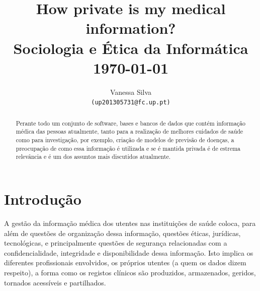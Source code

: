 \documentclass[conference]{IEEEtran}
\begin{document}
%
%

\title{How private is my medical information?\\
	\vspace*{10pt} \large Sociologia e Ética da Informática\\
		\normalsize \today{} }
%
\author{Vanessa Silva\\
	{\texttt{(up201305731@fc.up.pt)}}\\
}

\maketitle



\begin{abstract}

Perante todo um conjunto de software, bases e bancos de dados que contém informação médica das pessoas atualmente, tanto para a realização de melhores cuidados de saúde como para investigação, por exemplo, criação de modelos de previsão de doenças, a preocupação de como essa informação é utilizada e se é mantida privada é de estrema relevância e é um dos assuntos mais discutidos atualmente.

\end{abstract}



\IEEEpeerreviewmaketitle


\section{Introdução}

A gestão da informação médica dos utentes nas instituições de saúde coloca, para além de questões de organização dessa informação, questões éticas, jurídicas, tecnológicas, e principalmente questões de segurança relacionadas com a confidencialidade, integridade e disponibilidade dessa informação.
Isto implica os diferentes profissionais envolvidos, os próprios utentes (a quem os dados dizem respeito), a forma como os registos clínicos são produzidos, armazenados, geridos, tornados acessíveis e partilhados.
\end{document}
